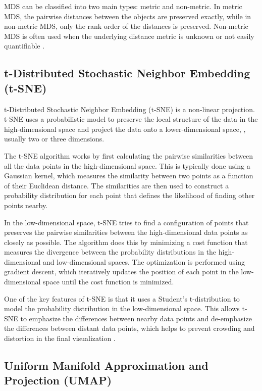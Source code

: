 MDS can be classified into two main types: metric and non-metric. In
metric MDS, the pairwise distances between the objects are preserved
exactly, while in non-metric MDS, only the rank order of the distances is
preserved. Non-metric MDS is often used when the underlying distance
metric is unknown or not easily quantifiable \parencite{morrison2003fast}.


\subsection{t-Distributed Stochastic Neighbor Embedding (t-SNE)}

t-Distributed Stochastic Neighbor Embedding (t-SNE) is a non-linear
projection. t-SNE uses a probabilistic model to preserve the local
structure of the data in the high-dimensional space and project the data
onto a lower-dimensional space, , usually two or three dimensions.

The t-SNE algorithm works by first calculating the pairwise similarities
between all the data points in the high-dimensional space. This is
typically done using a Gaussian kernel, which measures the similarity
between two points as a function of their Euclidean distance. The
similarities are then used to construct a probability distribution for
each point that defines the likelihood of finding other points nearby.

In the low-dimensional space, t-SNE tries to find a configuration of
points that preserves the pairwise similarities between the
high-dimensional data points as closely as possible. The algorithm does
this by minimizing a cost function that measures the divergence between
the probability distributions in the high-dimensional and low-dimensional
spaces. The optimization is performed using gradient descent, which
iteratively updates the position of each point in the low-dimensional
space until the cost function is minimized.

One of the key features of t-SNE is that it uses a Student's
t-distribution to model the probability distribution in the
low-dimensional space. This allows t-SNE to emphasize the differences
between nearby data points and de-emphasize the differences between
distant data points, which helps to prevent crowding and distortion in the
final visualization \parencite{van2008visualizing, wattenberg2016how}.


\subsection{Uniform Manifold Approximation and Projection (UMAP)}

